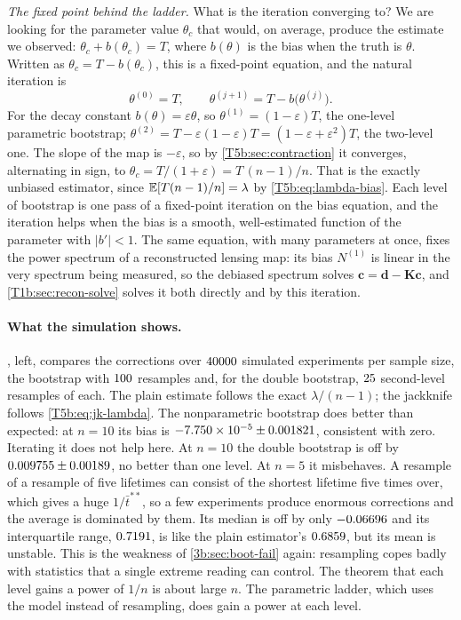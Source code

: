 \emph{The fixed point behind the ladder.} What is the iteration converging
to? We are looking for the parameter value $\theta_c$ that would, on average,
produce the estimate we observed: $\theta_c+b(\theta_c)=T$, where $b(\theta)$ is the
bias when the truth is $\theta$. Written as $\theta_c=T-b(\theta_c)$, this is a
fixed-point equation, and the natural iteration is
\begin{equation}
  \theta^{(0)}=T,\qquad \theta^{(j+1)}=T-b\bigl(\theta^{(j)}\bigr).
  \label{T5b:eq:bias-fixed-point}
\end{equation}
For the decay constant $b(\theta)=\varepsilon\theta$, so $\theta^{(1)}=(1-\varepsilon)T$, the one-level
parametric bootstrap; $\theta^{(2)}=T-\varepsilon(1-\varepsilon)T=(1-\varepsilon+\varepsilon^2)T$, the two-level one. The
slope of the map is $-\varepsilon$, so by \cref{T5b:sec:contraction} it converges,
alternating in sign, to $\theta_c=T/(1+\varepsilon)=T\,(n-1)/n$. That is the exactly
unbiased estimator, since $\E[T(n-1)/n]=\lambda$ by \eqref{T5b:eq:lambda-bias}. Each
level of bootstrap is one pass of a fixed-point iteration on the bias
equation, and the iteration helps when the bias is a smooth, well-estimated
function of the parameter with $|b'|<1$. The same equation, with many parameters at once,
fixes the power spectrum of a reconstructed lensing map: its bias $N^{(1)}$ is
linear in the very spectrum being measured, so the debiased spectrum solves
$\bm c=\bm d-\mathbf K\bm c$, and \cref{T1b:sec:recon-solve} solves it both
directly and by this iteration.

\paragraph{What the simulation shows.}
, left, compares the corrections over $40000$
simulated experiments per sample size, the bootstrap with $100$
resamples and, for the double bootstrap, $25$ second-level resamples
of each. The plain estimate follows the exact $\lambda/(n-1)$; the jackknife
follows \eqref{T5b:eq:jk-lambda}. The nonparametric bootstrap does better than
expected: at $n=10$ its bias is $-7.750\times10^{-5}\pm0.001821$, consistent
with zero. Iterating it does not help here. At $n=10$ the double bootstrap
is off by $0.009755\pm0.00189$, no better than one level.
At $n=5$ it misbehaves. A resample of a resample of five lifetimes can
consist of the shortest lifetime five times over, which gives a huge
$1/\bar t^{**}$, so a few experiments produce enormous corrections and the
average is dominated by them. Its median is off by only
$-0.06696$ and its interquartile range, $0.7191$, is
like the plain estimator's $0.6859$, but its mean is unstable.
This is the weakness of \cref{3b:sec:boot-fail} again: resampling copes badly
with statistics that a single extreme reading can control. The theorem that
each level gains a power of $1/n$ is about large $n$. The parametric ladder,
which uses the model instead of resampling, does gain a power at each level.

